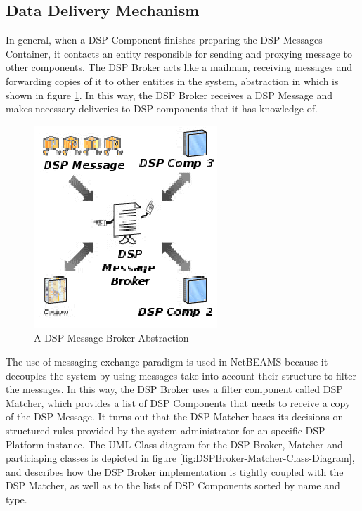 \newpage

\subsection{Data Delivery Mechanism}

In general, when a DSP Component finishes preparing the DSP Messages Container,
it contacts an entity responsible for sending and proxying message to other
components. The DSP Broker acts like a mailman, receiving messages and
forwarding copies of it to other entities in the system, abstraction in which
is shown in figure \ref{fig:DSP-Message-Broker-Abstraction}. In this way, the
DSP Broker receives a DSP Message and makes necessary deliveries to DSP
components that it has knowledge of.

\begin{figure}[!h]
  \centering
  \includegraphics[scale=0.8]{../diagrams/DSP-Message-Broker-Abstraction}
  \caption{A DSP Message Broker Abstraction}
  \label{fig:DSP-Message-Broker-Abstraction}
\end{figure}

The use of messaging exchange paradigm is used in NetBEAMS because it decouples
the system by using messages take into account their structure to filter the
messages. In this way, the DSP Broker uses a filter component called DSP
Matcher, which provides a list of DSP Components that needs to receive a copy
of the DSP Message. It turns out that the DSP Matcher bases its decisions on
structured rules provided by the system administrator for an specific DSP
Platform instance. The UML Class diagram for the DSP Broker, Matcher and
particiaping classes is depicted in figure
\ref{fig:DSPBroker-Matcher-Class-Diagram}, and describes how the DSP Broker
implementation is tightly coupled with the DSP Matcher, as well as to the
lists of DSP Components sorted by name and type.

